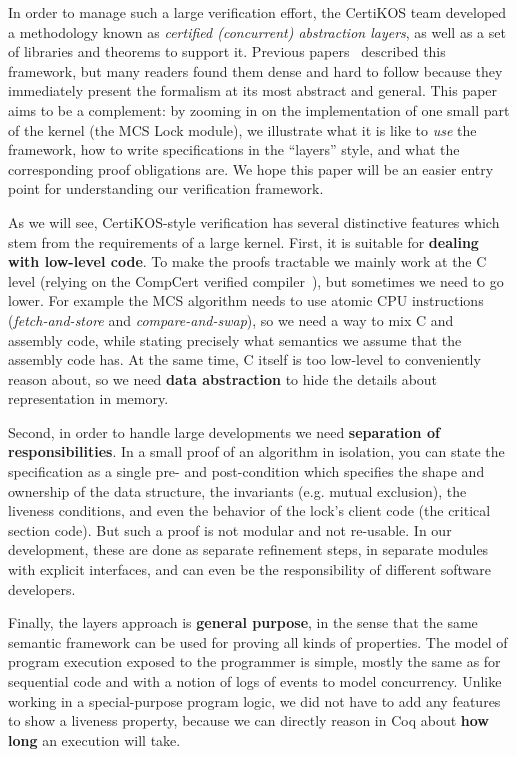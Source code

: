 In order to manage such a large verification effort, the CertiKOS team developed a methodology known as \emph{certified (concurrent) abstraction layers}, as well as a set of libraries and theorems to support it. Previous papers~\cite{dscal15,ccal16}
described this framework, but many readers found them  dense and hard to follow because they immediately present the formalism at its most abstract and general.
This paper aims to be a complement: by zooming in on the implementation of one small part of the kernel (the MCS Lock module), we illustrate  what it is like to \emph{use} the framework, how to write specifications in the ``layers'' style, and what the corresponding proof obligations are. We hope this paper will be an easier entry point for understanding our verification framework.

As we will see, CertiKOS-style verification has several distinctive features which stem from the requirements of a large kernel. First, it is suitable for {\bf dealing with low-level code}. To make the proofs tractable we mainly work at the C level (relying on the CompCert verified compiler~\cite{Leroy-Compcert-CACM}), but sometimes we need to go lower. For example the MCS algorithm needs to use atomic CPU instructions ({\em fetch-and-store} and {\em compare-and-swap}), so we need a way to  mix C and assembly code, while stating precisely what semantics we assume that the assembly code has. At the same time, C itself is too low-level to conveniently reason about, so we need {\bf data abstraction} to hide the details about representation in memory.

Second, in order to handle large developments we need {\bf separation of responsibilities}. In a small proof of an algorithm in isolation, you can state the specification as a single pre- and post-condition which specifies the shape and ownership of the data structure, the invariants (e.g. mutual exclusion), the liveness conditions, and even the behavior of the lock's client code (the critical section code). But such a proof is not modular and not re-usable. In our development, these are done as separate refinement steps, in separate modules with explicit interfaces, and can even be the responsibility of different software developers. 

Finally, the layers approach is {\bf general purpose}, in the sense
that the same semantic framework can be used for proving all kinds of
properties. The model of program execution exposed to the programmer
is simple, mostly the same as for sequential code and with a notion of logs of events to model concurrency.
Unlike working in a special-purpose program logic, we 
did not have to add any features to show a liveness property, because we can directly reason in Coq about \textbf{how long} an execution will take. 

